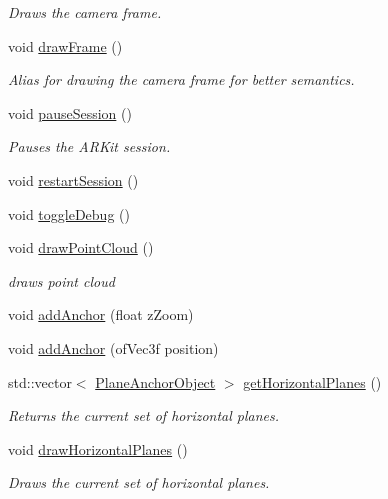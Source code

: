 \begin{DoxyCompactItemize}
\begin{DoxyCompactList}\small\item\em Draws the camera frame. \end{DoxyCompactList}\item 
void \hyperlink{class_a_r_processor_a685469fa6b66b8b5d935f6f45a2ef599}{draw\+Frame} ()
\begin{DoxyCompactList}\small\item\em Alias for drawing the camera frame for better semantics. \end{DoxyCompactList}\item 
void \hyperlink{class_a_r_processor_a035d352220785ee03e1bb15ba6bf688d}{pause\+Session} ()
\begin{DoxyCompactList}\small\item\em Pauses the A\+R\+Kit session. \end{DoxyCompactList}\item 
void \hyperlink{class_a_r_processor_a121cd3925743680196771ce07058d52e}{restart\+Session} ()
\item 
void \hyperlink{class_a_r_processor_a832585774cbeb04cc181f01c193940b5}{toggle\+Debug} ()
\item 
void \hyperlink{class_a_r_processor_ae938bf188d56d8b30b141b2fa23e96f8}{draw\+Point\+Cloud} ()
\begin{DoxyCompactList}\small\item\em draws point cloud \end{DoxyCompactList}\item 
void \hyperlink{class_a_r_processor_a6b6efec29e190aebd01bb770b6c218ed}{add\+Anchor} (float z\+Zoom)
\item 
void \hyperlink{class_a_r_processor_af4e627093ee86883736c89c2a627af42}{add\+Anchor} (of\+Vec3f position)
\item 
std\+::vector$<$ \hyperlink{struct_a_r_objects_1_1_plane_anchor_object}{Plane\+Anchor\+Object} $>$ \hyperlink{class_a_r_processor_a3cd70af245be375d56a06e2ea8d068f9}{get\+Horizontal\+Planes} ()
\begin{DoxyCompactList}\small\item\em Returns the current set of horizontal planes. \end{DoxyCompactList}\item 
void \hyperlink{class_a_r_processor_a6a61a7e03821410bc1a715fd32159662}{draw\+Horizontal\+Planes} ()
\begin{DoxyCompactList}\small\item\em Draws the current set of horizontal planes. \end{DoxyCompactList}\item 

\end{DoxyCompactItemize}
